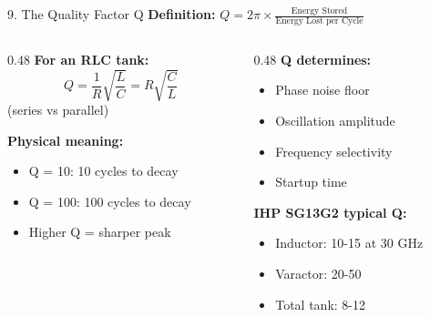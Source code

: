 \documentclass[aspectratio=169, 11pt]{beamer}
\begin{document}
\begin{frame}{9. The Quality Factor Q}
    \textbf{Definition:} $Q = 2\pi \times \frac{\text{Energy Stored}}{\text{Energy Lost per Cycle}}$

    \vspace{0.5em}
    \begin{columns}[T]
        \begin{column}{0.48\textwidth}
            \textbf{For an RLC tank:}
            \[ Q = \frac{1}{R}\sqrt{\frac{L}{C}} = R\sqrt{\frac{C}{L}} \]
            (series vs parallel)

            \vspace{0.5em}
            \textbf{Physical meaning:}
            \begin{itemize}
                \item Q = 10: 10 cycles to decay
                \item Q = 100: 100 cycles to decay
                \item Higher Q = sharper peak
            \end{itemize}
        \end{column}
        \begin{column}{0.48\textwidth}
            \textbf{Q determines:}
            \begin{itemize}
                \item Phase noise floor
                \item Oscillation amplitude
                \item Frequency selectivity
                \item Startup time
            \end{itemize}

            \vspace{0.5em}
            \textbf{IHP SG13G2 typical Q:}
            \begin{itemize}
                \item Inductor: 10-15 at 30 GHz
                \item Varactor: 20-50
                \item Total tank: 8-12
            \end{itemize}
        \end{column}
    \end{columns}
\end{frame}
\end{document}
